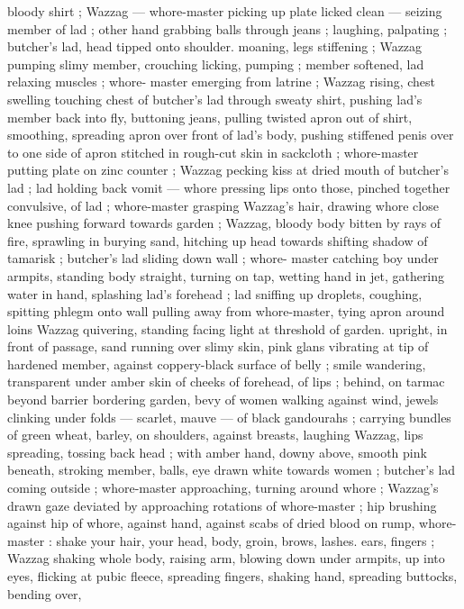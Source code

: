 {bloody shirt ; Wazzag --- whore-master picking up plate licked clean 
--- seizing member of lad ; other hand grabbing balls through jeans 
; laughing, palpating ; butcher's lad, head tipped onto shoulder. 
moaning, legs stiffening ; Wazzag pumping slimy member, crouching 
licking, pumping ; member softened, lad relaxing muscles ; whore- 
master emerging from latrine ; Wazzag rising, chest swelling 
touching chest of butcher's lad through sweaty shirt, pushing lad's 
member back into fly, buttoning jeans, pulling twisted apron out of 
shirt, smoothing, spreading apron over front of lad's body, pushing 
stiffened penis over to one side of apron stitched in rough-cut skin 
in sackcloth ; whore-master putting plate on zinc counter ; Wazzag 
pecking kiss at dried mouth of butcher's lad ; lad holding back vomit 
--- whore pressing lips onto those, pinched together convulsive, of 
lad ; whore-master grasping Wazzag's hair, drawing whore close 
knee pushing forward towards garden ; Wazzag, bloody body bitten 
by rays of fire, sprawling in burying sand, hitching up head towards 
shifting shadow of tamarisk ; butcher's lad sliding down wall ; whore- 
master catching boy under armpits, standing body straight, turning 
on tap, wetting hand in jet, gathering water in hand, splashing lad's 
forehead ; lad sniffing up droplets, coughing, spitting phlegm onto 
wall pulling away from whore-master, tying apron around loins 
Wazzag quivering, standing facing light at threshold of garden. 
upright, in front of passage, sand running over slimy skin, pink glans 
vibrating at tip of hardened member, against coppery-black surface 
of belly ; smile wandering, transparent under amber skin of cheeks 
of forehead, of lips ; behind, on tarmac beyond barrier bordering 
garden, bevy of women walking against wind, jewels clinking under 
folds --- scarlet, mauve --- of black gandourahs ; carrying bundles 
of green wheat, barley, on shoulders, against breasts, laughing 
Wazzag, lips spreading, tossing back head ; with amber hand, downy 
above, smooth pink beneath, stroking member, balls, eye drawn 
white towards women ; butcher's lad coming outside ; whore-master 
approaching, turning around whore ; Wazzag's drawn gaze deviated 
by approaching rotations of whore-master ; hip brushing against hip 
of whore, against hand, against scabs of dried blood on rump, 
whore-master :{\td} {\gl} {\td} shake your hair, your head, body, groin, brows, 
lashes. ears, fingers{\td} {\gr} ; Wazzag shaking whole body, raising arm, 
blowing down under armpits, up into eyes, flicking at pubic fleece, 
spreading fingers, shaking hand, spreading buttocks, bending over, 
}
